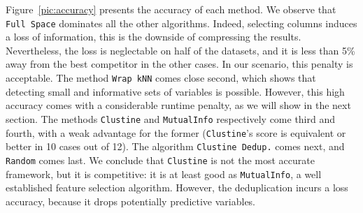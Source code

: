 Figure~\ref{pic:accuracy} presents the accuracy of each method. We observe that
\texttt{Full Space} dominates all the other algorithms.  Indeed, selecting
columns induces a loss of information, this is the downside of compressing the
results.  Nevertheless, the loss is neglectable on half of the datasets, and it
is less than 5\% away from the best competitor in the other cases. In our
scenario, this penalty is acceptable. The method \texttt{Wrap kNN} comes close
second, which shows that detecting small and informative sets of variables is
possible. However, this high accuracy comes with a considerable runtime
penalty, as we will show in the next section.  The methods \texttt{Clustine}
and \texttt{MutualInfo} respectively come third and fourth, with a weak
advantage for the former (\texttt{Clustine}'s score is equivalent or better in
10 cases out of 12). The algorithm \texttt{Clustine Dedup.} comes next, and
\texttt{Random} comes last. We conclude that \texttt{Clustine} is not the most
accurate framework, but it is competitive: it is at least good as
\texttt{MutualInfo}, a well established feature selection algorithm.  However,
the deduplication incurs a loss accuracy, because it drops potentially
predictive variables.
%
%
%
%

